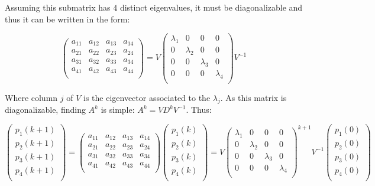\documentclass[12pt,a4paper]{article}
\begin{document}
Assuming this submatrix has $4$ distinct eigenvalues, it must be diagonalizable and thus it can be written in the form:

$$\begin{pmatrix}
a_{11} & a_{12} & a_{13} & a_{14}\\
a_{21} & a_{22} & a_{23} & a_{24}\\
a_{31} & a_{32} & a_{33} & a_{34} \\
a_{41} & a_{42} & a_{43} & a_{44}\\
\end{pmatrix}
 = V  \begin{pmatrix}
 \lambda_1 & 0 & 0 & 0 \\
 0 & \lambda_2 & 0 & 0 \\
 0 & 0 & \lambda_3 & 0 \\
  0 & 0 & 0 & \lambda_4 \\
 \end{pmatrix}  V^{-1}
$$

Where column $j$ of $V$ is the eigenvector associated to the $\lambda_j$. As this matrix is diagonalizable, finding $A^k$ is simple: $A^k = VD^kV^{-1}$. Thus:

$$\begin{pmatrix}
p_1(k+1)\\
p_2(k+1)\\
p_3(k+1)\\
p_4(k+1)\\
\end{pmatrix} = \begin{pmatrix}
a_{11} & a_{12} & a_{13} & a_{14}\\
a_{21} & a_{22} & a_{23} & a_{24}\\
a_{31} & a_{32} & a_{33} & a_{34} \\
a_{41} & a_{42} & a_{43} & a_{44}\\

\end{pmatrix}  \begin{pmatrix}
p_1(k)\\
p_2(k)\\
p_3(k)\\
p_4(k)\\
\end{pmatrix} = V  \begin{pmatrix}
 \lambda_1 & 0 & 0 & 0 \\
 0 & \lambda_2 & 0 & 0 \\
 0 & 0 & \lambda_3 & 0 \\
  0 & 0 & 0 & \lambda_4 \\
 \end{pmatrix}^{k+1}  V^{-1}  \begin{pmatrix}
p_1(0)\\
p_2(0)\\
p_3(0)\\
p_4(0)\\
\end{pmatrix} $$
\end{document}

